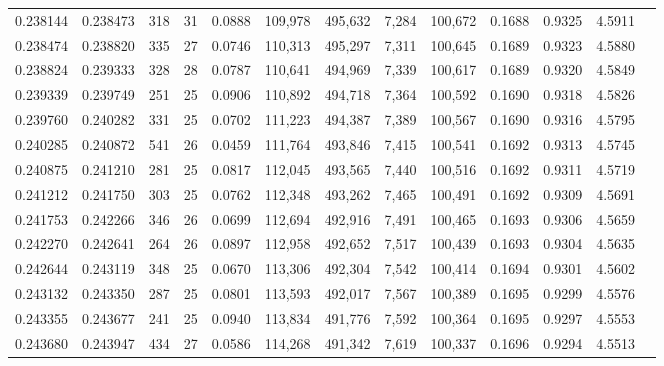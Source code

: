 \begin{tabular}{rrrrrrrrrrrrr}
0.238144 & 0.238473 &   318 &  31 &                                     0.0888 & 109,978 & 495,632 &   7,284 & 100,672 & 0.1688 & 0.9325 & 4.5911 \\
0.238474 & 0.238820 &   335 &  27 &                                     0.0746 & 110,313 & 495,297 &   7,311 & 100,645 & 0.1689 & 0.9323 & 4.5880 \\
0.238824 & 0.239333 &   328 &  28 &                                     0.0787 & 110,641 & 494,969 &   7,339 & 100,617 & 0.1689 & 0.9320 & 4.5849 \\
0.239339 & 0.239749 &   251 &  25 &                                     0.0906 & 110,892 & 494,718 &   7,364 & 100,592 & 0.1690 & 0.9318 & 4.5826 \\
0.239760 & 0.240282 &   331 &  25 &                                     0.0702 & 111,223 & 494,387 &   7,389 & 100,567 & 0.1690 & 0.9316 & 4.5795 \\
0.240285 & 0.240872 &   541 &  26 &                                     0.0459 & 111,764 & 493,846 &   7,415 & 100,541 & 0.1692 & 0.9313 & 4.5745 \\
0.240875 & 0.241210 &   281 &  25 &                                     0.0817 & 112,045 & 493,565 &   7,440 & 100,516 & 0.1692 & 0.9311 & 4.5719 \\
0.241212 & 0.241750 &   303 &  25 &                                     0.0762 & 112,348 & 493,262 &   7,465 & 100,491 & 0.1692 & 0.9309 & 4.5691 \\
0.241753 & 0.242266 &   346 &  26 &                                     0.0699 & 112,694 & 492,916 &   7,491 & 100,465 & 0.1693 & 0.9306 & 4.5659 \\
0.242270 & 0.242641 &   264 &  26 &                                     0.0897 & 112,958 & 492,652 &   7,517 & 100,439 & 0.1693 & 0.9304 & 4.5635 \\
0.242644 & 0.243119 &   348 &  25 &                                     0.0670 & 113,306 & 492,304 &   7,542 & 100,414 & 0.1694 & 0.9301 & 4.5602 \\
0.243132 & 0.243350 &   287 &  25 &                                     0.0801 & 113,593 & 492,017 &   7,567 & 100,389 & 0.1695 & 0.9299 & 4.5576 \\
0.243355 & 0.243677 &   241 &  25 &                                     0.0940 & 113,834 & 491,776 &   7,592 & 100,364 & 0.1695 & 0.9297 & 4.5553 \\
0.243680 & 0.243947 &   434 &  27 &                                     0.0586 & 114,268 & 491,342 &   7,619 & 100,337 & 0.1696 & 0.9294 & 4.5513 \\

\end{tabular}
